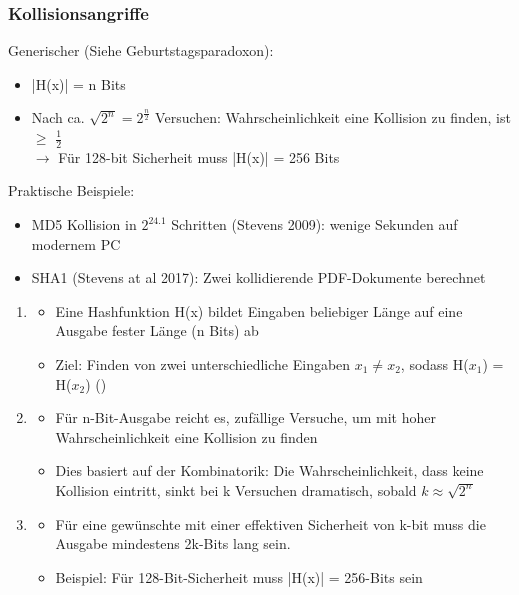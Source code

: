 \subsubsection*{Kollisionsangriffe}
Generischer  (Siehe Geburtstagsparadoxon):
\begin{itemize}
    \item |H(x)| = n Bits
    \item Nach ca. $\sqrt{2^{n}} = 2^{\frac{n}{2}}$ Versuchen: Wahrscheinlichkeit eine Kollision zu finden, ist $\geq$ $\frac{1}{2}$\\
    $\rightarrow$ Für 128-bit Sicherheit muss |H(x)| = 256 Bits
\end{itemize}
Praktische Beispiele:
\begin{itemize}
    \item MD5 Kollision in $2^{24.1}$ Schritten (Stevens 2009): wenige Sekunden auf modernem PC
    \item SHA1 (Stevens at al 2017): Zwei kollidierende PDF-Dokumente berechnet
\end{itemize}
\begin{infoBox}[title=Generischer Brute-Force-Angriff auf Hashfunktionen]
    \begin{enumerate}
        \item {}
        \begin{itemize}
            \item Eine Hashfunktion H(x) bildet Eingaben beliebiger Länge auf eine Ausgabe fester Länge (n Bits) ab
            \item Ziel: Finden von zwei unterschiedliche Eingaben $x_{1} \neq x_{2}$, sodass H($x_{1}$) = H($x_{2}$) ()
        \end{itemize}
        \item {}
        \begin{itemize}
            \item Für n-Bit-Ausgabe reicht es,  zufällige Versuche, um mit hoher Wahrscheinlichkeit eine Kollision zu finden
            \item Dies basiert auf der Kombinatorik: Die Wahrscheinlichkeit, dass keine Kollision eintritt, sinkt bei k Versuchen dramatisch, sobald $k \approx \sqrt{2^{n}}$
        \end{itemize}
        \item {}
        \begin{itemize}
            \item Für eine gewünschte  mit einer effektiven Sicherheit von k-bit muss die Ausgabe mindestens 2k-Bits lang sein.
            \item Beispiel: Für 128-Bit-Sicherheit muss |H(x)| = 256-Bits sein
        \end{itemize}
    \end{enumerate}
\end{infoBox}

